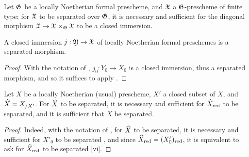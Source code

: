 \begin{cor}[10.15.5]
\label{1.10.15.5}
Let $\mathfrak{G}$ be a locally Noetherian formal prescheme, and $\mathfrak{X}$ a $\mathfrak{G}$-prescheme of finite type;
for $\mathfrak{X}$ to be separated over $\mathfrak{G}$, it is necessary and sufficient for the diagonal morphism $\fk{X}\to\fk{X}\times_\fk{G}\fk{X}$ to be a closed immersion.
\end{cor}

\begin{prop}[10.15.6]
\label{1.10.15.6}
A closed immersion $j:\fk{Y}\to\fk{X}$ of locally Noetherian formal preschemes is a separated morphism.
\end{prop}

\begin{proof}
\label{proof-1.10.15.6}
With the notation of , $j_0:Y_0\to X_0$ is a closed immersion, thus a separated morphism, and so it suffices to apply .
\end{proof}

\begin{prop}[10.15.7]
\label{1.10.15.7}
Let $X$ be a locally Noetherian (usual) prescheme, $X'$ a closed subset of $X$, and $\widehat{X}=X_{/X'}$.
For $\widehat{X}$ to be separated, it is necessary and sufficient for $\widehat{X}_{\mathrm{red}}$ to be separated, and it is sufficient that $X$ be separated.
\end{prop}

\begin{proof}
\label{proof-1.10.15.7}
Indeed, with the notation of , for $\widehat{X}$ to be separated, it is necessary and sufficient for $X'_0$ to be separated , and since $\widehat{X}_{\mathrm{red}}=(X'_0)_{\mathrm{red}}$, it is equivalent to ask for $\widehat{X}_{\mathrm{red}}$ to be separated [vi].
\end{proof}
